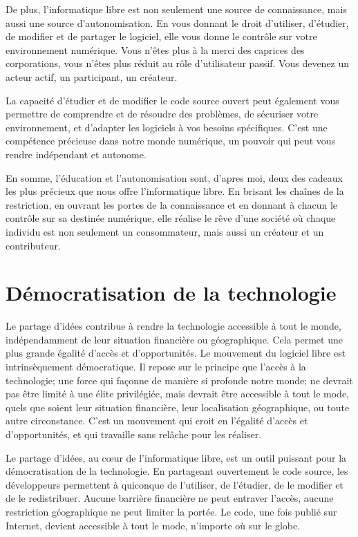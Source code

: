 De plus, l'informatique libre est non seulement une source de connaissance, mais aussi une source d'autonomisation. En vous donnant le droit d'utiliser, d'étudier, de modifier et de partager le logiciel, elle vous donne le contrôle sur votre environnement numérique. Vous n'êtes plus à la merci des caprices des corporations, vous n'êtes plus réduit au rôle d'utilisateur passif. Vous devenez un acteur actif, un participant, un créateur.

La capacité d'étudier et de modifier le code source ouvert peut également vous permettre de comprendre et de résoudre des problèmes, de sécuriser votre environnement, et d'adapter les logiciels à vos besoins spécifiques. C'est une compétence précieuse dans notre monde numérique, un pouvoir qui peut vous rendre indépendant et autonome.

En somme, l'éducation et l'autonomisation sont, d'apres moi, deux des cadeaux les plus précieux que nous offre l'informatique libre. En brisant les chaînes de la restriction, en ouvrant les portes de la connaissance et en donnant à chacun le contrôle sur sa destinée numérique, elle réalise le rêve d'une société où chaque individu est non seulement un consommateur, mais aussi un créateur et un contributeur.



\section{Démocratisation de la technologie}
Le partage d'idées contribue à rendre la technologie accessible à tout le monde, indépendamment de leur situation financière ou géographique. Cela permet une plus grande égalité d'accès et d'opportunités.
Le mouvement du logiciel libre est intrinsèquement démocratique. Il repose sur le principe que l'accès à la technologie; une force qui façonne de manière si profonde notre monde; ne devrait pas être limité à une élite privilégiée, mais devrait être accessible à tout le mode, quels que soient leur situation financière, leur localisation géographique, ou toute autre circonstance. C'est un mouvement qui croit en l'égalité d'accès et d'opportunités, et qui travaille sans relâche pour les réaliser.

Le partage d'idées, au cœur de l'informatique libre, est un outil puissant pour la démocratisation de la technologie. En partageant ouvertement le code source, les développeurs permettent à quiconque de l'utiliser, de l'étudier, de le modifier et de le redistribuer. Aucune barrière financière ne peut entraver l'accès, aucune restriction géographique ne peut limiter la portée. Le code, une fois publié sur Internet, devient accessible à tout le mode, n'importe où sur le globe.

